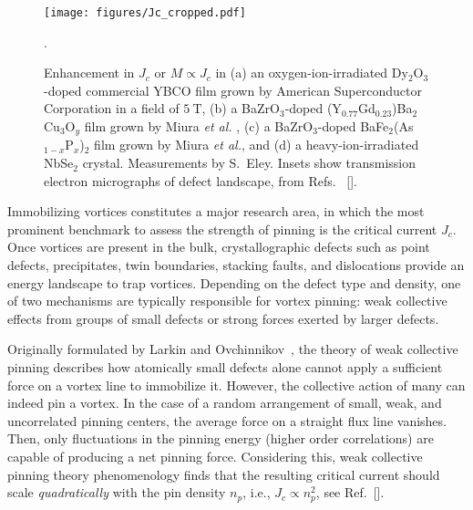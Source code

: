 \documentclass[%
 aip,
 amsmath,amssymb,
 reprint,%
floatfix]{revtex4-1}
\newcommand{\Jc}{J_{c}}
\begin{document}
%
\begin{figure*}[t!]
\texttt{[image: figures/Jc\_cropped.pdf]}

\caption{Enhancement in $\Jc$ or $M \propto \Jc$ in (a) an oxygen-ion-irradiated Dy$_2$O$_3$-doped commercial YBCO film grown by American Superconductor Corporation\cite{Leroux2015, Eley2017a} in a field of $\SI{5}{\tesla}$, (b) a BaZrO$_3$-doped (Y$_{0.77}$Gd$_{0.23}$)Ba$_2$Cu$_3$O$_y$ film grown by Miura \textit{et al.} \cite{Miura2013k}, (c) a BaZrO$_3$-doped BaFe$_2$(As$_{1-x}$P$_x$)$_2$ film grown by Miura \textit{et al.}\cite{Eley2017}, and (d) a heavy-ion-irradiated NbSe$_2$ crystal\cite{Eley2018}. Measurements by S.\ Eley. Insets show transmission electron micrographs of defect landscape, from Refs. ~[].}.\label{fig:Jcenhancement}
\end{figure*}
%



Immobilizing vortices constitutes a major research area, in which the most prominent benchmark to assess the strength of  pinning is the critical current $\Jc$. \cite{Bean1964, Zeldov1994, Zeldov1994b, Brandt1999, Willa2014, Gurevich2014, Gurevich2017, Gurevich2018, Kubo2019, Dhakal2020} Once vortices are present in the bulk, crystallographic defects such as point defects, precipitates, twin boundaries, stacking faults, and dislocations provide an energy landscape to trap vortices.  Depending on the defect type and density, one of two mechanisms are typically responsible for vortex pinning: weak collective effects from groups of small defects or strong forces exerted by larger defects.

Originally formulated by Larkin and Ovchinnikov~\cite{Larkin1979}, the theory of weak collective pinning describes how atomically small defects alone cannot apply a sufficient force on a vortex line to immobilize it. However, the collective action of many can indeed pin a vortex. In the case of a random arrangement of small, weak, and uncorrelated pinning centers, the average force on a straight flux line vanishes. Then, only fluctuations in the pinning energy (higher order correlations) are capable of producing a net pinning force.  Considering this, weak collective pinning theory phenomenology finds that the resulting critical current should scale \emph{quadratically} with the pin density $n_{p}$, i.e., $J_{c} \propto n_{p}^{2}$, see Ref.~[].
\end{document}
